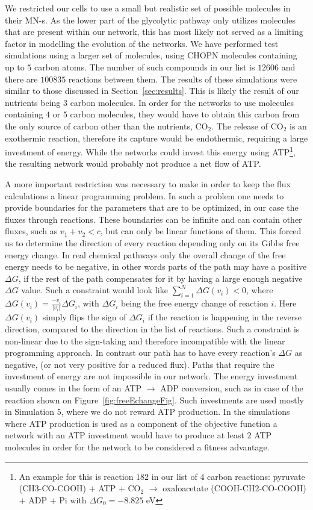 \documentclass[a4paper,12pt]{article}
\begin{document}
We restricted our cells to use a small but realistic set of possible molecules in their MN-s. As the lower part of the glycolytic pathway only utilizes molecules that are present within our network, this has most likely not served as a limiting factor in modelling the evolution of the networks. We have performed test simulations using a larger set of molecules, using CHOPN molecules containing up to $5$ carbon atoms. The number of such compounds in our list is $12606$ and there are $100 835$ reactions between them. The results of these simulations were similar to those discussed in Section~\ref{sec:results}. This is likely the result of our nutrients being $3$ carbon molecules. In order for the networks to use molecules containing $4$ or $5$ carbon molecules, they would have to obtain this carbon from the only source of carbon other than the nutrients, CO$_2$. The release of CO$_2$ is an exothermic reaction, therefore its capture would be endothermic, requiring a large investment of energy. While the networks could invest this energy using ATP\footnote{ An example for this is reaction $182$ in our list of $4$ carbon reactions: pyruvate (CH3-CO-COOH) $+$ ATP $+$ CO$_2$ $\rightarrow$  oxaloacetate (COOH-CH2-CO-COOH) $+$ ADP $+$ Pi with $\Delta G_0=-8.825$ eV}, the resulting network would probably not produce a net flow of ATP. 

A more important restriction was necessary to make in order to keep the flux calculations a linear programming problem. In such a problem one needs to provide boundaries for the parameters that are to be optimized, in our case the fluxes through reactions. These boundaries can be infinite and can contain other fluxes, such as $v_1+v_2 < c$, but can only be linear functions of them. This forced us to determine the direction of every reaction depending only on its Gibbs free energy change. In real chemical pathways only the overall change of the free energy needs to be negative, in other words parts of the path may have a positive $\Delta G$, if the rest of the path compensates for it by having a large enough negative $\Delta G$ value. Such a constraint would look like $\sum_{i=1}^N \Delta G \left( v_i \right)<0$, where $\Delta G \left( v_i \right)=\frac{-v_i}{|v_i|} \Delta G_i$, with $\Delta G_i$ being the free energy change of reaction $i$. Here $\Delta G \left( v_i \right)$ simply flips the sign of $\Delta G_i$ if the reaction is happening in the reverse direction, compared to the direction in the list of reactions. Such a constraint is non-linear due to the sign-taking and therefore incompatible with the linear programming approach. In contrast our path has to have every reaction's $\Delta G$ as negative, (or not very positive for a reduced flux).
Paths that require the investment of energy are not impossible in our network. The energy investment usually comes in the form of an ATP $\rightarrow$ ADP conversion, such as in case of the reaction shown on Figure~\ref{fig:freeEchangeFig}. Such investments are used mostly in Simulation $5$, where we do not reward ATP production. In the simulations where ATP production is used as a component of the objective function a network with an ATP investment would have to produce at least $2$ ATP molecules in order for the network to be considered a fitness advantage.  
\end{document}
